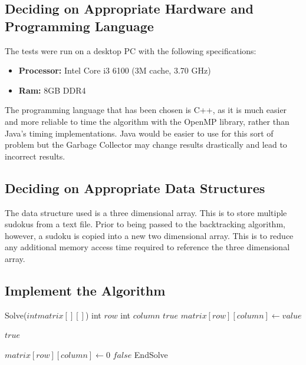 \documentclass{article}
\begin{document}
\newpage

\subsection{Deciding on Appropriate Hardware and Programming Language}
The tests were run on a desktop PC with the following specifications:
\begin{itemize}
	\item \textbf{Processor:} Intel Core i3 6100 (3M cache, 3.70 GHz)
	\item \textbf{Ram:} 8GB DDR4
\end{itemize}

The programming language that has been chosen is C++, as it is much easier and more reliable to time the algorithm with the OpenMP library, rather than Java's timing implementations. Java would be easier to use for this sort of problem but the Garbage Collector may change results drastically and lead to incorrect results.

\subsection{Deciding on Appropriate Data Structures}
The data structure used is a three dimensional array. This is to store multiple sudokus from a text file. Prior to being passed to the backtracking algorithm, however, a sudoku is copied into a new two dimensional array. This is to reduce any additional memory access time required to reference the three dimensional array.

\newpage

\subsection{Implement the Algorithm}

    \begin{algorithmic}[1]
    
    \STATE Solve($int matrix[][]$)
        \STATE int $row$
        \STATE int $column$
\newline
            \RETURN $true$
        \ENDIF
\newline
                \STATE $matrix[row][column]\gets value$
            
                    \RETURN $true$
                \ENDIF
                
                \STATE $matrix[row][column]\gets 0$
            \ENDIF
        \ENDFOR
\newline
        \RETURN $false$
    \STATE EndSolve
\newline
    \end{algorithmic}
\end{document}
